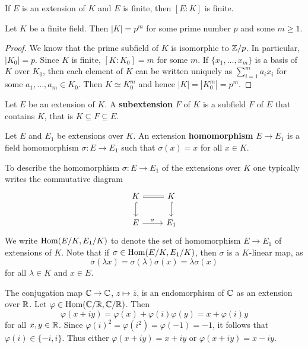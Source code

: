 If $E$ is an extension of $K$ and $E$ is finite,
then $[E:K]$ is finite. 

\begin{proposition}
	Let $K$ be a finite field. Then $|K|=p^m$ 
	for some prime number $p$ and some $m\geq1$. 
\end{proposition}

\begin{proof}
	We know that the prime subfield of $K$ is isomorphic to $\mathbb{Z}/p$. 
	In particular, $|K_0|=p$. Since $K$ is finite, 
	$[K:K_0]=m$ for some $m$. If $\{x_1,\dots,x_m\}$ is a basis
	of $K$ over $K_0$, then each element
	of $K$ can be written uniquely as
	$\sum_{i=1}^ma_ix_i$ for some $a_1,\dots,a_m\in K_0$. Then
	$K\simeq K_0^m$ and hence $|K|=|K_0^m|=p^m$. 
\end{proof}

\begin{definition}
	Let $E$ be an extension of $K$. A \textbf{subextension} $F$ 
	of $K$ is a subfield $F$ of $E$ that contains $K$, that is
	$K\subseteq F\subseteq E$. 
\end{definition}

\begin{definition}
	Let $E$ and $E_1$ be extensions over $K$. An extension
	\textbf{homomorphism} $E\to E_1$ is a 
	field homomorphism $\sigma\colon E\to E_1$ such that 
	$\sigma(x)=x$ for all $x\in K$. 
\end{definition}

To describe the homomorphism $\sigma\colon E\to E_1$ of the extensions over $K$
one typically writes the commutative diagram 
\[
	\begin{tikzcd}
	K & K \\
	E & {E_1} 
	\arrow["\sigma", from=2-1, to=2-2]
	\arrow[equal, no head, from=1-1, to=1-2]
	\arrow[hook, from=1-1, to=2-1]
	\arrow[hook, from=1-2, to=2-2]
\end{tikzcd}
\]
We write $\operatorname{Hom}(E/K,E_1/K)$ to denote
the set of homomorphism $E\to E_1$ of extensions of $K$. Note
that if $\sigma\in\operatorname{Hom}(E/K,E_1/K)$, then
$\sigma$ is a $K$-linear map, as
\[
	\sigma(\lambda x)=\sigma(\lambda)\sigma(x)=\lambda\sigma(x)
\]
for all $\lambda\in K$ and $x\in E$. 

\begin{example}
	The conjugation map $\mathbb{C}\to\mathbb{C}$, $z\mapsto\overline{z}$, 
	is an endomorphism of $\mathbb{C}$ as an extension over $\mathbb{R}$. Let 
	$\varphi\in\operatorname{Hom}(\mathbb{C}/\mathbb{R},\mathbb{C}/\mathbb{R})$. Then 
	\[
	\varphi(x+iy)=\varphi(x)+\varphi(i)\varphi(y)=x+\varphi(i)y
	\]
	for all $x,y\in\mathbb{R}$. Since $\varphi(i)^2=\varphi(i^2)=\varphi(-1)=-1$, 
	it follows that $\varphi(i)\in\{-i,i\}$. Thus either 
	$\varphi(x+iy)=x+iy$ or $\varphi(x+iy)=x-iy$. 
\end{example}

